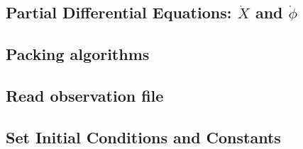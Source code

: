 \documentclass[a4paper,11pt]{article}
\begin{document}
	 \subsection{Partial Differential Equations: $\dot{X}$ and $\dot{\phi}$}
	 
	 
	 \subsection{Packing algorithms}
	 
	 
	 
	 
	 
	 \subsection{Read observation file}
	 
	 
	 \subsection{Set Initial Conditions and Constants}
	 
	 
\end{document}
